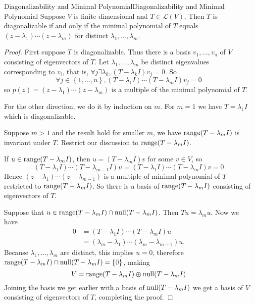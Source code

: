 \documentclass[../main.tex]{subfiles}
\begin{document}
\begin{theorem}{Diagonalizability and Minimal Polynomial}{Diagonalizability and Minimal Polynomial}
Suppose $V$ is finite dimensional and $T\in \mathscr{L}(V)$. Then $T$ is diagonalizable if and only if the minimal polynomial of $T$ equals $(z-\lambda_1)\cdots (z-\lambda_m)$ for distinct $\lambda_1, \ldots ,\lambda_m$.
\end{theorem}
\begin{proof}
First suppose $T$ is diagonalizable. Thus there is a basis $v_1, \ldots ,v_n$ of $V$ consisting of eigenvectors of $T$. Let $\lambda_1, \ldots ,\lambda_m$ be distinct eigenvalues corresponding to $v_i$, that is, $\forall j\exists \lambda_k, (T-\lambda_kI)v_j=0$. So
\begin{equation*}
\forall j\in \left\{ 1, \ldots ,n \right\}, (T-\lambda_1I)\cdots (T-\lambda_mI)v_j=0
\end{equation*}
so $p(z) = (z-\lambda_1)\cdots (z-\lambda_m)$ is a multiple of the minimal polynomial of $T$.

For the other direction, we do it by induction on $m$. For $m=1$ we have $T=\lambda_1I$ which is diagonalizable.

Suppose $m>1$ and the result hold for smaller $m$, we have $\operatorname{range} (T-\lambda_mI)$ is invariant under $T$. Restrict our discussion to $\operatorname{range} (T-\lambda_mI)$.

If $u\in \operatorname{range} (T-\lambda_mI)$, then $u = (T-\lambda_mI)v$ for some $v\in V$, so
\begin{equation*}
	(T-\lambda_1I)\cdots (T-\lambda_{m-1}I)u = (T-\lambda_1I)\cdots (T-\lambda_mI)v=0
\end{equation*}
Hence $(z-\lambda_1)\cdots (z-\lambda_{m-1})$ is a multiple of minimal polynomial of $T$ restricted to $\operatorname{range} (T-\lambda_mI)$. So there is a basis of $\operatorname{range} (T-\lambda_mI)$ consisting of eigenvectors of $T$.

Suppose that $u\in \operatorname{range} (T-\lambda_mI)\cap \operatorname{null} (T-\lambda_mI)$. Then $Tu=\lambda_m u$. Now we have
\begin{equation*}
\begin{aligned}
	0&=(T-\lambda_1I)\cdots (T-\lambda_mI)u\\
	 &=(\lambda_m-\lambda_1)\cdots (\lambda_m-\lambda_{m-1})u.
\end{aligned}
\end{equation*}
Because $\lambda_1, \ldots ,\lambda_m$ are distinct, this implies $u=0$, therefore $\operatorname{range} (T-\lambda_mI) \cap \operatorname{null} (T-\lambda_mI) = \left\{ 0 \right\}$, making
 \begin{equation*}
V = \operatorname{range} (T-\lambda_mI) \oplus \operatorname{null} (T-\lambda_mI)
\end{equation*}
Joining the basis we get earlier with a basis of $\operatorname{null} (T-\lambda_mI)$ we get a basis of $V$ consisting of eigenvectors of $T$, completing the proof.
\end{proof}
\end{document}
